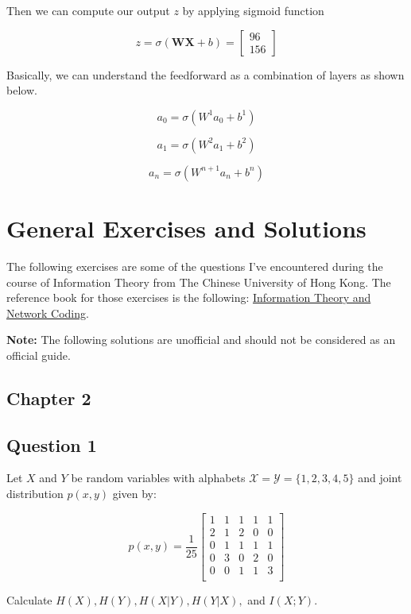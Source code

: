 \documentclass[a4paper,10pt]{article}
\begin{document}
Then we can compute our output $z$ by applying sigmoid function 

$$
z = \sigma(\bm{W}\bm{X} + b) = \begin{bmatrix}
    96 \\
    156
\end{bmatrix}
$$

Basically, we can understand the feedforward as a combination of layers as shown below.

$$
    a_0 = \sigma(W^1 a_0 + b^1)
$$

$$
    a_1 = \sigma(W^2 a_1 + b^2)
$$

$$
    a_n = \sigma(W^{n+1} a_n + b^n)
$$

\section{General Exercises and Solutions}

The following exercises are some of the questions I've encountered during the course of Information Theory from The Chinese University of Hong Kong. The reference book for those exercises is the following: \href{https://link.springer.com/book/10.1007/978-0-387-79234-7}{Information Theory and Network Coding}.

\noindent \textbf{Note:} The following solutions are unofficial and should not be considered as an official guide.

\subsection{Chapter 2}

\subsection*{Question 1}
Let $X$ and $Y$ be random variables with alphabets $\mathcal{X} = \mathcal{Y} = \{1, 2, 3, 4, 5\}$ and joint distribution $p(x, y)$ given by:

$$
p(x, y) = \frac{1}{25}
\begin{bmatrix}
1 & 1 & 1 & 1 & 1 \\
2 & 1 & 2 & 0 & 0 \\
0 & 1 & 1 & 1 & 1 \\
0 & 3 & 0 & 2 & 0 \\
0 & 0 & 1 & 1 & 3 \\
\end{bmatrix}
$$

Calculate $H(X), H(Y), H(X|Y), H(Y|X),$ and $I(X;Y)$.
\end{document}
